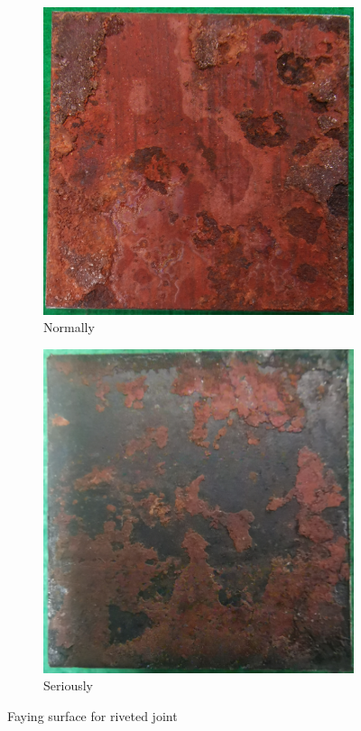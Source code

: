 \begin{figure}[htbp]
    \centering
    \begin{subfigure}[t]{0.4\textwidth}
    \includegraphics[width=\linewidth]{imgs/ch3/fig2a.png}
    \caption{Normally}
    \label{ch3fig2a}  
    \end{subfigure}
    \hfill
    \begin{subfigure}[t]{0.4\textwidth}
    \includegraphics[width=\linewidth]{imgs/ch3/fig2b.png}
    \caption{Seriously}
    \label{ch3fig2b}  
    \end{subfigure}
    \caption{Faying surface for riveted joint}
\end{figure}

